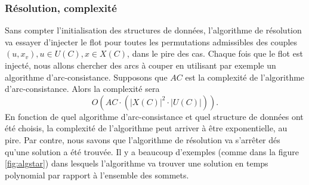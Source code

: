 \documentclass[french]{article}
\theoremstyle{definition}
\theoremstyle{remark}
\begin{document}
\subsubsection{Résolution, complexité}
Sans compter l'initialisation des structures de données, l'algorithme de résolution va essayer d'injecter le flot pour toutes les permutations admissibles des couples $(u, x_v), u \in U(C), x \in X(C)$, dans le pire des cas. Chaque fois que le flot est injecté, nous allons chercher des arcs à couper en utilisant par exemple un algorithme d'arc-consistance. Supposons que $AC$ est la complexité de l'algorithme d'arc-consistance.  
Alors la complexité sera $$O(AC \cdot (|X(C)|^2 \cdot |U(C)|)).$$
En fonction de quel algorithme d'arc-consistance et quel structure de données ont été choisis, la complexité de l'algorithme peut arriver à être exponentielle, au pire.
Par contre, nous savons que l'algorithme de résolution va s'arrêter dés qu'une solution a été trouvée. Il y a beaucoup d'exemples (comme dans la figure \ref{fig:algstar}) dans lesquels l'algorithme va trouver une solution en temps polynomial par rapport à l'ensemble des sommets.
\begin{comment}
\begin{algorithm}
	\caption{Résolution du réseau de valeurs}
	\begin{algorithmic}[1]
		\State $Q \gets U(C)$
		\State $Q' \gets X(C)$
		\While { $Q$ not empty }
		\State $u \gets dequeue(Q)$
		\State $x_v \gets dequeue(Q')$
		\State $Sol \gets (u, x_v) $ 
		\ForAll{$a \in A$}
		\If { $a$ doesn't respect \it alldiff \rm or adjacency constraint}
		\State delete $a$
		\EndIf
		\EndFor
		\EndWhile
	\end{algorithmic}
\end{algorithm}
\end{comment}

\end{document}
